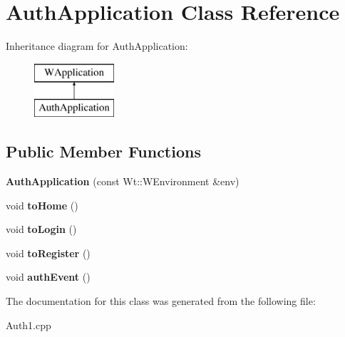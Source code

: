 \hypertarget{class_auth_application}{}\section{Auth\+Application Class Reference}
\label{class_auth_application}
Inheritance diagram for Auth\+Application\+:\begin{figure}[H]
\begin{center}
\leavevmode
\includegraphics[height=2.000000cm]{class_auth_application}
\end{center}
\end{figure}
\subsection*{Public Member Functions}
\begin{DoxyCompactItemize}
\item 
\mbox{\label{class_auth_application_a4d06dfaf02cf7bb4319ce17448d96d2c}} 
{\bfseries Auth\+Application} (const Wt\+::\+W\+Environment \&env)
\item 
\mbox{\label{class_auth_application_a48308192a84c5c4b4b14cad505064e4f}} 
void {\bfseries to\+Home} ()
\item 
\mbox{\label{class_auth_application_a858d1317e8ef7239389dc074e9d2413b}} 
void {\bfseries to\+Login} ()
\item 
\mbox{\label{class_auth_application_ac88047c5dab3e09322fcf2a7609b0e73}} 
void {\bfseries to\+Register} ()
\item 
\mbox{\label{class_auth_application_a5ef2f6766fa817e850ce6aa7c031d8e2}} 
void {\bfseries auth\+Event} ()
\end{DoxyCompactItemize}


The documentation for this class was generated from the following file\+:\begin{DoxyCompactItemize}
\item 
Auth1.\+cpp\end{DoxyCompactItemize}
